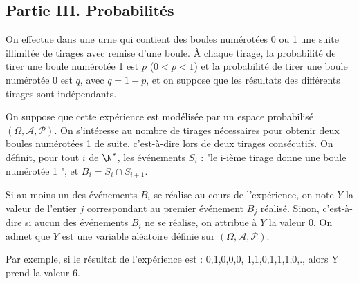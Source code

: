 \documentclass[11pt]{article}%
\begin{document}
\subsection*{Partie III. Probabilités}

On effectue dans une urne qui contient des boules numérotées 0 ou 1
une suite illimitée de tirages avec remise d'une boule. \`{A} chaque
tirage, la probabilité de tirer une boule numérotée 1 est $p$ ($0<p<1$)
et la probabilité de tirer une boule numérotée $0$ est $q $, avec $q =
1-p$, et on suppose que les résultats des différents
tirages sont indépendants.

On suppose que cette expérience est modélisée par un espace
probabilisé $\left( \Omega,\mathcal{A},\mathcal{P}\right) $. On
s'intéresse au nombre de tirages nécessaires pour obtenir deux boules
numérotées 1 de suite, c'est-à-dire lors de deux tirages consécutifs.
On définit, pour tout $i$ de $\N^{\ast}$, les événements $S_{i}$ : "le
i-ième tirage donne une boule numérotée 1
", et $B_{i} = S_{i}\cap S_{i + 1}.$

Si au moins un des événements $B_{i}$ se réalise au cours de
l'expérience, on note $Y$ la valeur de l'entier $j$ correspondant au
premier événement $B_{j}$ réalisé. Sinon, c'est-à-dire
si aucun des événements $B_{i}$ ne se réalise, on attribue à 
$Y$ la valeur 0. On admet que $Y$ est une variable aléatoire définie
sur $\left( \Omega,\mathcal{A},\mathcal{P}\right) $.

Par exemple, si le résultat de l'expérience est : 0,1,0,0,0,
1,1,0,1,1,1,0,., alors Y prend la valeur 6.
\end{document}
